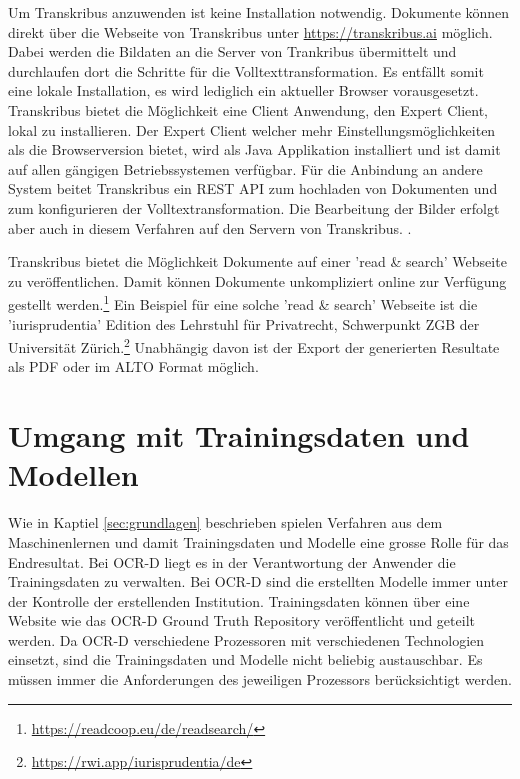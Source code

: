 \documentclass[a4paper,oneside, 12pt]{report}
\begin{document}
Um Transkribus anzuwenden ist keine Installation notwendig. Dokumente können direkt über die Webseite von Transkribus unter \url{https://transkribus.ai} möglich. Dabei werden die Bildaten an die Server von Trankribus übermittelt und durchlaufen dort die Schritte für die Volltexttransformation. Es entfällt somit eine lokale Installation, es wird lediglich ein aktueller Browser vorausgesetzt. Transkribus bietet die Möglichkeit eine Client Anwendung, den Expert Client, lokal zu installieren. Der Expert Client welcher mehr Einstellungsmöglichkeiten als die Browserversion bietet, wird als Java Applikation installiert und ist damit auf allen gängigen Betriebssystemen verfügbar. 
Für die Anbindung an andere System beitet Transkribus ein REST API zum hochladen von Dokumenten und zum konfigurieren der Volltextransformation. Die Bearbeitung der Bilder erfolgt aber auch in diesem Verfahren auf den Servern von Transkribus. \cite{transkribusapi}. 

Transkribus bietet die Möglichkeit Dokumente auf einer 'read \& search' Webseite zu veröffentlichen. Damit können Dokumente unkompliziert online zur Verfügung gestellt werden.\footnote{\url{https://readcoop.eu/de/readsearch/}} Ein Beispiel für eine solche 'read \& search' Webseite ist die 'iurisprudentia' Edition des Lehrstuhl für Privatrecht, Schwerpunkt ZGB der Universität Zürich.\footnote{\url{https://rwi.app/iurisprudentia/de}}  Unabhängig davon ist der Export der generierten Resultate als PDF oder im ALTO Format möglich. \cite{transkribus}



\section{Umgang mit Trainingsdaten und Modellen}
Wie in Kaptiel \ref{sec:grundlagen} beschrieben spielen Verfahren aus dem Maschinenlernen und damit Trainingsdaten und Modelle eine grosse Rolle für das Endresultat. Bei OCR-D liegt es in der Verantwortung der Anwender die Trainingsdaten zu verwalten. Bei OCR-D sind die erstellten Modelle immer unter der Kontrolle der erstellenden Institution. Trainingsdaten können über eine Website wie das OCR-D Ground Truth Repository veröffentlicht und geteilt werden. Da OCR-D verschiedene Prozessoren mit verschiedenen Technologien einsetzt, sind die Trainingsdaten und Modelle nicht beliebig austauschbar. Es müssen immer die Anforderungen des jeweiligen Prozessors berücksichtigt werden. \cite{ocrdgtrepo}
\end{document}
